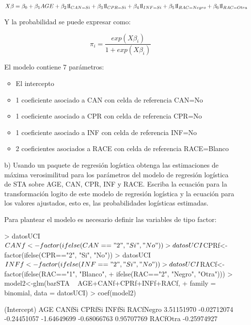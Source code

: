 \documentclass[11pt,onside]{article}
\begin{document}
\begin{itemize}
$$X \beta=\beta_{0}+\beta_{1}AGE+\beta_{2} \leavevmode\hbox{1\!\rm I}_{CAN=Si} +\beta_{3}\leavevmode\hbox{1\!\rm I}_{CPR=Si}+ \beta_{4}\leavevmode\hbox{1\!\rm I}_{INF=Si}+\beta_{5}\leavevmode\hbox{1\!\rm I}_{RAC=Negro}+\beta_{6}\leavevmode\hbox{1\!\rm I}_{RAC=Otra}$$


Y la probabilidad se puede expresar como:

$$\pi_{i}=\frac{exp(X\beta_{i})} {1+exp(X\beta_{i})}$$


El modelo contiene 7 parámetros:


\begin{itemize}
\item El intercepto
\item 1 coeficiente asociado a CAN con celda de referencia CAN=No
\item 1 coeficiente asociado a CPR con celda de referencia CPR=No
\item 1 coeficiente asociado a INF con celda de referencia INF=No
\item 2 coeficientes asociados a RACE con celda de referencia RACE=Blanco

\end{itemize}



\item[b)] Usando un paquete de regresión logística obtenga las estimaciones de máxima verosimilitud para los parámetros del modelo de regresión logística de STA sobre AGE, CAN, CPR, INF y RACE. Escriba la ecuación para la transformación logito de este modelo de regresión logística y la ecuación para los valores ajustados, esto es, las probabilidades logísticas estimadas.


Para plantear el modelo es necesario definir las variables de tipo factor:

\begin{Schunk}
\begin{Sinput}
> datosUCI$CANf<-factor(ifelse(CAN=="2", "Si", "No"))
> datosUCI$CPRf<-factor(ifelse(CPR=="2", "Si", "No"))
> datosUCI$INFf<-factor(ifelse(INF=="2", "Si", "No"))
> datosUCI$RACf<-factor(ifelse(RAC=="1", "Blanco", 
+                              ifelse(RAC=="2", "Negro", "Otra")))
> model2<-glm(barSTA ~ AGE+CANf+CPRf+INFf+RACf, 
+             family = binomial, data = datosUCI)
> coef(model2)
\end{Sinput}
\begin{Soutput}
(Intercept)         AGE      CANfSi      CPRfSi      INFfSi   RACfNegro 
 3.51151970 -0.02712074 -0.24451057 -1.64649699 -0.68066763  0.95707769 
   RACfOtra 
-0.25974927 
\end{Soutput}
\end{Schunk}


\end{itemize}
\end{document}
